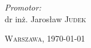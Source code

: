 \begin{titlepage}
	\vspace{0.05\textheight}

	\begin{flushright}
		\begin{minipage}{0.4\textwidth}
		\begin{flushright}
		\emph{Promotor:}\\
		dr inż. Jarosław \textsc{Judek}
		\end{flushright}
		\end{minipage}
	\end{flushright}

	\vfill

	\begin{center} {\large \textsc {Warszawa,} \today} \end{center}
\end{titlepage}

